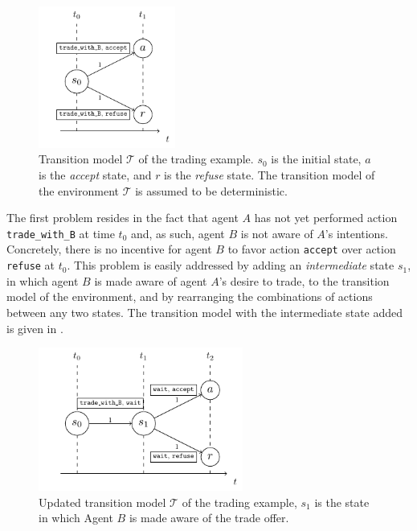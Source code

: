 \begin{figure}[h]
  \begin{center}
    \includegraphics[width=0.4\textwidth]{images/MasterThesisDirectedActionsDraw (2).pdf}
  \end{center}
  \caption{Transition model $\mathcal{T}$ of the trading example. $s_0$ is the initial state, $a$ is the \textit{accept} state, and $r$ is the \textit{refuse} state. The transition model of the environment $\mathcal{T}$ is assumed to be deterministic.}\label{fig:dir15}
\end{figure}



The first problem resides in the fact that agent $A$ has not yet performed action \texttt{trade\_with\_B} at time $t_0$ and, as such, agent $B$ is not aware of $A$'s intentions. Concretely, there is no incentive for agent $B$ to favor action \texttt{accept} over action \texttt{refuse} at $t_0$. This problem is easily addressed by adding an \textit{intermediate} state $s_1$, in which agent $B$ is made aware of agent $A$'s desire to trade, to the transition model of the environment, and by rearranging the combinations of actions between any two states. The transition model with the intermediate state added is given in .

\begin{figure}[h]
  \begin{center}
    \includegraphics[width=0.6\textwidth]{images/MasterThesisDirectedNewDraw (2).pdf}
  \end{center}
  \caption{Updated transition model $\mathcal{T}$ of the trading example, $s_1$ is the state in which Agent $B$ is made aware of the trade offer.}\label{fig:dir2}
\end{figure}

